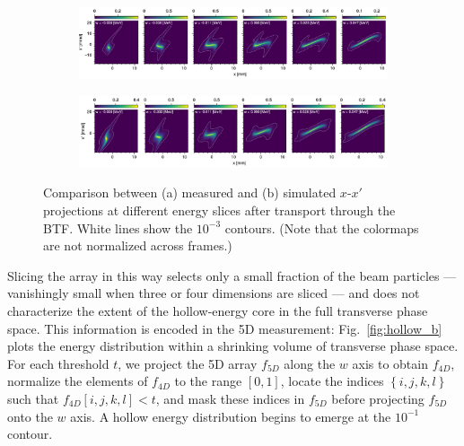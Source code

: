 \documentclass[letterpaper,
               keeplastbox,
               nospread,
               biblatex,
              ]{jacow}
\begin{document}
%
\begin{figure}[!t]
    \centering
    \vfill
    \vfill
    \begin{subfigure}{\textwidth}
        \includegraphics[width=\textwidth]{VS34_energy_slice2.pdf}
        \caption{}
        \label{fig:VS34_c}
    \end{subfigure}
    \vfill
    \vfill
    \begin{subfigure}{\textwidth}
        \includegraphics[width=\textwidth]{VS34_energy_slices_sim.pdf}
        \caption{}
        \label{fig:VS34_d}
    \end{subfigure}
    \caption{Comparison between (a) measured and (b) simulated $x$-$x'$ projections at different energy slices after transport through the BTF. White lines show the $10^{-3}$ contours. (Note that the colormaps are not normalized across frames.)}
    \label{fig:VS34}
\end{figure}
%

Slicing the array in this way selects only a small fraction of the beam particles — vanishingly small when three or four dimensions are sliced — and does not characterize the extent of the hollow-energy core in the full transverse phase space. This information is encoded in the 5D measurement: Fig.~\ref{fig:hollow_b} plots the energy distribution within a shrinking volume of transverse phase space. For each threshold $t$, we project the 5D array $f_{5D}$ along the $w$ axis to obtain $f_{4D}$, normalize the elements of $f_{4D}$ to the range $[0, 1]$, locate the indices $\left\{i, j, k, l\right\}$ such that $f_{4D}[i, j, k, l] < t$, and mask these indices in $f_{5D}$ before projecting $f_{5D}$ onto the $w$ axis. A hollow energy distribution begins to emerge at the $10^{-1}$ contour.
\end{document}
